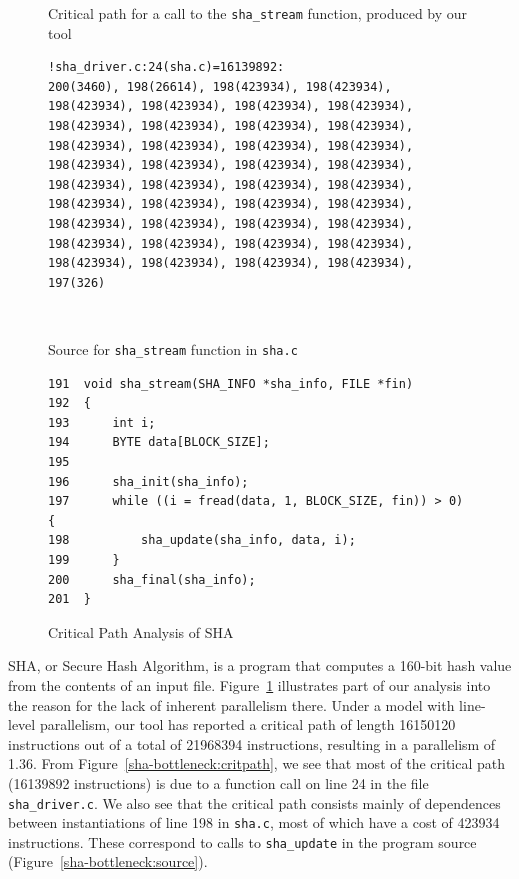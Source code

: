\begin{figure}
  \begin{center}
    \scriptsize
    \begin{SubFloat}{\label{sha-bottleneck:critpath}Critical path for a call to the \texttt{sha\_stream} function, produced by our tool}
      \begin{minipage}{3in}
        \begin{verbatim}
!sha_driver.c:24(sha.c)=16139892:
200(3460), 198(26614), 198(423934), 198(423934),
198(423934), 198(423934), 198(423934), 198(423934),
198(423934), 198(423934), 198(423934), 198(423934),
198(423934), 198(423934), 198(423934), 198(423934),
198(423934), 198(423934), 198(423934), 198(423934),
198(423934), 198(423934), 198(423934), 198(423934),
198(423934), 198(423934), 198(423934), 198(423934),
198(423934), 198(423934), 198(423934), 198(423934),
198(423934), 198(423934), 198(423934), 198(423934),
198(423934), 198(423934), 198(423934), 198(423934),
197(326)
        \end{verbatim}
      \end{minipage}
    \end{SubFloat}
\\
    \begin{SubFloat}{\label{sha-bottleneck:source}Source for \texttt{sha\_stream} function in \texttt{sha.c}}
      \begin{minipage}{3in}
        \begin{verbatim}
191  void sha_stream(SHA_INFO *sha_info, FILE *fin)
192  {
193      int i;
194      BYTE data[BLOCK_SIZE];
195
196      sha_init(sha_info);
197      while ((i = fread(data, 1, BLOCK_SIZE, fin)) > 0) {
198          sha_update(sha_info, data, i);
199      }
200      sha_final(sha_info);
201  }
        \end{verbatim}
      \end{minipage}
    \end{SubFloat}
  \end{center}
  \caption{Critical Path Analysis of SHA}
  \label{sha-bottleneck}
\end{figure}

SHA, or Secure Hash Algorithm, is a program that computes a 160-bit hash value from the contents of an input file.
Figure~\ref{sha-bottleneck} illustrates part of our analysis into the reason for the lack of inherent parallelism there.
Under a model with line-level parallelism, our tool has reported a critical path of length 16150120 instructions out of a total of 21968394 instructions, resulting in a parallelism of 1.36.
From Figure~\ref{sha-bottleneck:critpath}, we see that most of the critical path (16139892 instructions) is due to a function call on line 24 in the file \texttt{sha\_driver.c}.
We also see that the critical path consists mainly of dependences between instantiations of line 198 in \texttt{sha.c}, most of which have a cost of 423934 instructions.
These correspond to calls to \texttt{sha\_update} in the program source (Figure~\ref{sha-bottleneck:source}).

